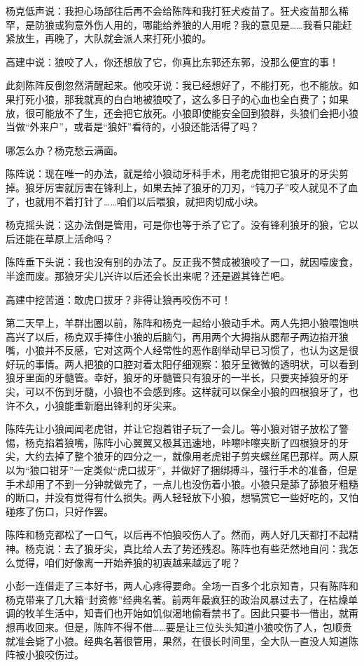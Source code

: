 \par 杨克低声说：我担心场部往后再不会给陈阵和我打狂犬疫苗了。狂犬疫苗那么稀罕，是防狼或狗意外伤人用的，哪能给养狼的人用呢？我的意见是……我看只能赶紧放生，再晚了，大队就会派人来打死小狼的。
\par 高建中说：狼咬了人，你还想放了它，你真比东郭还东郭，没那么便宜的事！
\par 此刻陈阵反倒忽然清醒起来。他咬牙说：我已经想好了，不能打死，也不能放。如果打死小狼，那我就真的白白地被狼咬了，这么多日子的心血也全白费了；如果放，很可能放不了生，还会把它放死。小狼即使能安全回到狼群，头狼们会把小狼当做“外来户”，或者是“狼奸”看待的，小狼还能活得了吗？
\par 哪怎么办？杨克愁云满面。
\par 陈阵说：现在唯一的办法，就是给小狼动牙科手术，用老虎钳把它狼牙的牙尖剪掉。狼牙厉害就厉害在锋利上，如果去掉了狼牙的刀刃，“钝刀子”咬人就见不了血了，也就用不着打针了……咱们以后喂狼，就把肉切成小块。
\par 杨克摇头说：这办法倒是管用，可是你也等于杀了它了。没有锋利狼牙的狼，它以后还能在草原上活命吗？
\par 陈阵垂下头说：我也没有别的办法了。反正我不赞成被狼咬了一口，就因噎废食，半途而废。那狼牙尖儿兴许以后还会长出来呢？还是避其锋芒吧。
\par 高建中挖苦道：敢虎口拔牙？非得让狼再咬伤不可！
\par 第二天早上，羊群出圈以前，陈阵和杨克一起给小狼动手术。两人先把小狼喂饱哄高兴了以后，杨克双手捧住小狼的后脑勺，再用两个大拇指从腮帮子两边掐开狼嘴，小狼并不反感，它对这两个人经常性的恶作剧举动早已习惯了，也认为这是很好玩的事情。两人把狼的口腔对着太阳仔细观察：狼牙呈微微的透明状，可以看到狼牙里面的牙髓管。幸好，狼牙的牙髓管只有狼牙的一半长，只要夹掉狼牙的牙尖，可以不伤到牙髓，小狼也不会感到疼。这样就可以保全小狼的四根狼牙了，也许不久，小狼能重新磨出锋利的牙尖来。
\par 陈阵先让小狼闻闻老虎钳，并让它抱着钳子玩了一会儿。等小狼对钳子放松了警惕，杨克掐着狼嘴，陈阵小心翼翼又极其迅速地，咔嚓咔嚓夹断了四根狼牙的牙尖，大约去掉了整个狼牙的四分之一，就像用老虎钳子剪夹螺丝尾巴那样。两人原以为“狼口钳牙”一定类似“虎口拔牙”，并做好了捆绑搏斗，强行手术的准备，但是手术却用了不到一分钟就做完了，一点儿也没伤着小狼。小狼只是舔了舔狼牙粗糙的断口，并没有觉得有什么损失。两人轻轻放下小狼，想犒赏它一些好吃的，又怕碰疼了伤口，只好作罢。
\par 陈阵和杨克都松了一口气，以后再不怕狼咬伤人了。然而，两人好几天都打不起精神。杨克说：去了狼牙尖，真比给人去了势还残忍。陈阵也有些茫然地自问：我怎么觉得，咱们好像离一开始养狼的初衷越来越远了呢？
\par 小彭一连借走了三本好书，两人心疼得要命。全场一百多个北京知青，只有陈阵和杨克带来了几大箱“封资修”经典名著。前两年最疯狂的政治风暴过去了，在枯燥单调的牧羊生活中，知青们也开始如饥似渴地偷看禁书了。因此只要书一借出，就甭想再收回来。但是，陈阵不得不借……要是让三位头头知道小狼咬伤了人，包顺贵就准会毙了小狼。经典名著很管用，果然，在很长时间里，全大队一直没人知道陈阵被小狼咬伤过。








